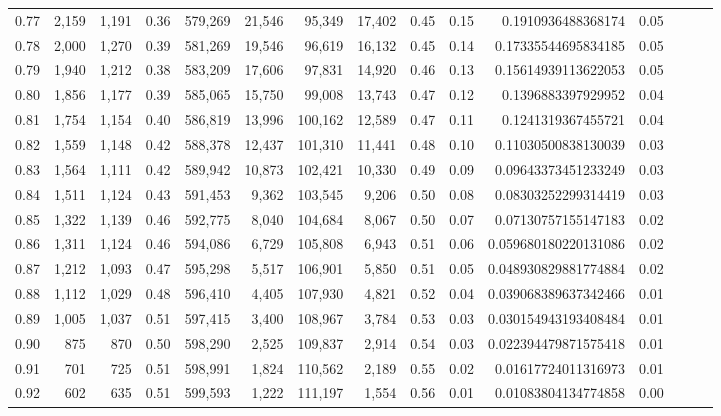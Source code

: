 \begin{tabular}{rrrrrrrrrrrrrrr}
0.77 &   2,159 &  1,191 &  0.36 &  579,269 &   21,546 &   95,349 &   17,402 &  0.45 &  0.15 &     0.1910936488368174 &      0.05 \\
0.78 &   2,000 &  1,270 &  0.39 &  581,269 &   19,546 &   96,619 &   16,132 &  0.45 &  0.14 &    0.17335544695834185 &      0.05 \\
0.79 &   1,940 &  1,212 &  0.38 &  583,209 &   17,606 &   97,831 &   14,920 &  0.46 &  0.13 &    0.15614939113622053 &      0.05 \\
0.80 &   1,856 &  1,177 &  0.39 &  585,065 &   15,750 &   99,008 &   13,743 &  0.47 &  0.12 &     0.1396883397929952 &      0.04 \\
0.81 &   1,754 &  1,154 &  0.40 &  586,819 &   13,996 &  100,162 &   12,589 &  0.47 &  0.11 &     0.1241319367455721 &      0.04 \\
0.82 &   1,559 &  1,148 &  0.42 &  588,378 &   12,437 &  101,310 &   11,441 &  0.48 &  0.10 &    0.11030500838130039 &      0.03 \\
0.83 &   1,564 &  1,111 &  0.42 &  589,942 &   10,873 &  102,421 &   10,330 &  0.49 &  0.09 &    0.09643373451233249 &      0.03 \\
0.84 &   1,511 &  1,124 &  0.43 &  591,453 &    9,362 &  103,545 &    9,206 &  0.50 &  0.08 &    0.08303252299314419 &      0.03 \\
0.85 &   1,322 &  1,139 &  0.46 &  592,775 &    8,040 &  104,684 &    8,067 &  0.50 &  0.07 &    0.07130757155147183 &      0.02 \\
0.86 &   1,311 &  1,124 &  0.46 &  594,086 &    6,729 &  105,808 &    6,943 &  0.51 &  0.06 &   0.059680180220131086 &      0.02 \\
0.87 &   1,212 &  1,093 &  0.47 &  595,298 &    5,517 &  106,901 &    5,850 &  0.51 &  0.05 &   0.048930829881774884 &      0.02 \\
0.88 &   1,112 &  1,029 &  0.48 &  596,410 &    4,405 &  107,930 &    4,821 &  0.52 &  0.04 &   0.039068389637342466 &      0.01 \\
0.89 &   1,005 &  1,037 &  0.51 &  597,415 &    3,400 &  108,967 &    3,784 &  0.53 &  0.03 &   0.030154943193408484 &      0.01 \\
0.90 &     875 &    870 &  0.50 &  598,290 &    2,525 &  109,837 &    2,914 &  0.54 &  0.03 &   0.022394479871575418 &      0.01 \\
0.91 &     701 &    725 &  0.51 &  598,991 &    1,824 &  110,562 &    2,189 &  0.55 &  0.02 &    0.01617724011316973 &      0.01 \\
0.92 &     602 &    635 &  0.51 &  599,593 &    1,222 &  111,197 &    1,554 &  0.56 &  0.01 &    0.01083804134774858 &      0.00 \\

\end{tabular}
